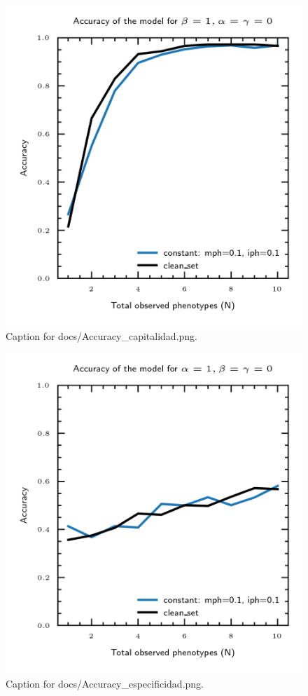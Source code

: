 \documentclass{article}
\begin{document}
\begin{figure}[h] \centering \includegraphics{docs/Accuracy_capitalidad.png} \caption{Caption for docs/Accuracy_capitalidad.png.} \end{figure}
\begin{figure}[h] \centering \includegraphics{docs/Accuracy_especificidad.png} \caption{Caption for docs/Accuracy_especificidad.png.} \end{figure}
\end{document}
